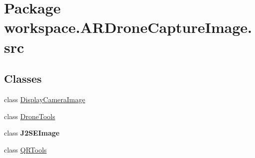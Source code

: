 \hypertarget{namespaceworkspace_1_1_a_r_drone_capture_image_1_1src}{}\section{Package workspace.\+A\+R\+Drone\+Capture\+Image.\+src}
\label{namespaceworkspace_1_1_a_r_drone_capture_image_1_1src}
\subsection*{Classes}
\begin{DoxyCompactItemize}
\item 
class \hyperlink{classworkspace_1_1_a_r_drone_capture_image_1_1src_1_1_display_camera_image}{Display\+Camera\+Image}
\item 
class \hyperlink{classworkspace_1_1_a_r_drone_capture_image_1_1src_1_1_drone_tools}{Drone\+Tools}
\item 
class {\bfseries J2\+S\+E\+Image}
\item 
class \hyperlink{classworkspace_1_1_a_r_drone_capture_image_1_1src_1_1_q_r_tools}{Q\+R\+Tools}
\end{DoxyCompactItemize}
